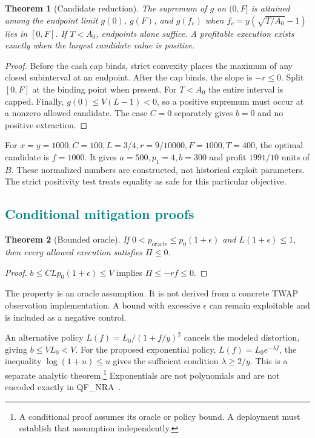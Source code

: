 \documentclass[conference]{IEEEtran}
\newtheorem{theorem}{Theorem}
\begin{document}
\begin{theorem}[Candidate reduction]
The supremum of $g$ on $(0,F]$ is attained among the endpoint limit $g(0)$,
$g(F)$, and $g(f_c)$ when $f_c=y(\sqrt{T/A_0}-1)$ lies in $[0,F]$.
If $T<A_0$, endpoints alone suffice. A profitable execution exists exactly
when the largest candidate value is positive.
\end{theorem}
\begin{proof}
Before the cash cap binds, strict convexity places the maximum of any closed
subinterval at an endpoint. After the cap binds, the slope is $-r\leq0$.
Split $[0,F]$ at the binding point when present. For $T<A_0$ the entire
interval is capped. Finally, $g(0)\leq V(L-1)<0$, so a positive supremum
must occur at a nonzero allowed candidate. The case $C=0$ separately gives
$b=0$ and no positive extraction.
\end{proof}

For $x=y=1000,C=100,L=3/4,r=9/10000,F=1000,T=400$, the optimal candidate
is $f=1000$. It gives $a=500,p_1=4,b=300$ and profit $1991/10$ units of $B$.
These normalized numbers are constructed, not historical exploit parameters.
The strict positivity test treats equality as safe for this particular objective.

\subsection{\textcolor{Teal}{Conditional mitigation proofs}}
\begin{theorem}[Bounded oracle]
If $0<p_{\mathrm{oracle}}\leq p_0(1+\epsilon)$ and $L(1+\epsilon)\leq1$,
then every allowed execution satisfies $\Pi\leq0$.
\end{theorem}
\begin{proof}
$b\leq CLp_0(1+\epsilon)\leq V$ implies $\Pi\leq-rf\leq0$.
\end{proof}
The property is an oracle assumption. It is not derived from a concrete TWAP
observation implementation. A bound with excessive $\epsilon$ can remain
exploitable and is included as a negative control.

An alternative policy $L(f)=L_0/(1+f/y)^2$ cancels the modeled distortion,
giving $b\leq VL_0<V$. For the proposed exponential policy,
$L(f)=L_0e^{-\lambda f}$, the inequality $\log(1+u)\leq u$ gives the sufficient
condition $\lambda\geq2/y$. This is a separate analytic theorem.\footnote{A conditional proof assumes its oracle or policy bound. A deployment must establish that assumption independently.} Exponentials
are not polynomials and are not encoded exactly in QF\_NRA~\cite{z3}.
\end{document}
